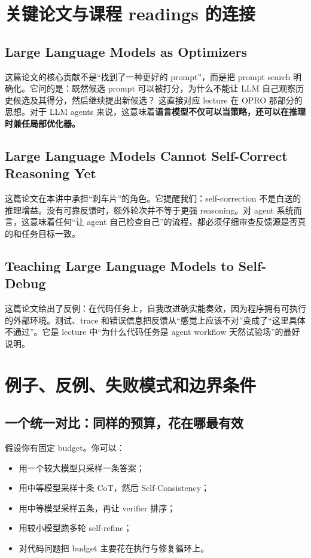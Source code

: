 \section{关键论文与课程 readings 的连接}

\subsection{Large Language Models as Optimizers}

这篇论文的核心贡献不是“找到了一种更好的 prompt”，而是把 prompt search 明确化。它问的是：既然候选 prompt 可以被打分，为什么不能让 LLM 自己观察历史候选及其得分，然后继续提出新候选？ 这直接对应 lecture 在 OPRO 那部分的思想。对于 LLM agents 来说，这意味着\textbf{语言模型不仅可以当策略，还可以在推理时兼任局部优化器。}

\subsection{Large Language Models Cannot Self-Correct Reasoning Yet}

这篇论文在本讲中承担“刹车片”的角色。它提醒我们：self-correction 不是白送的推理增益。没有可靠反馈时，额外轮次并不等于更强 reasoning。对 agent 系统而言，这意味着任何“让 agent 自己检查自己”的流程，都必须仔细审查反馈源是否真的和任务目标一致。

\subsection{Teaching Large Language Models to Self-Debug}

这篇论文给出了反例：在代码任务上，自我改进确实能奏效，因为程序拥有可执行的外部环境。测试、trace 和错误信息把反馈从“感觉上应该不对”变成了“这里具体不通过”。它是 lecture 中“为什么代码任务是 agent workflow 天然试验场”的最好说明。

\section{例子、反例、失败模式和边界条件}

\subsection{一个统一对比：同样的预算，花在哪最有效}

假设你有固定 budget。你可以：
\begin{itemize}
\item 用一个较大模型只采样一条答案；
\item 用中等模型采样十条 CoT，然后 Self-Consistency；
\item 用中等模型采样五条，再让 verifier 排序；
\item 用较小模型跑多轮 self-refine；
\item 对代码问题把 budget 主要花在执行与修复循环上。
\end{itemize}


